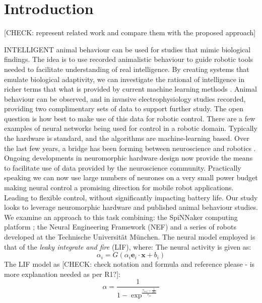 \documentclass[conference]{IEEEtran}
\begin{document}
\IEEEpeerreviewmaketitle


\section{Introduction}

[CHECK: represent related work and compare them with the proposed approach]

INTELLIGENT animal behaviour can be used for studies that mimic biological findings. The idea is to use recorded animalistic behaviour to guide robotic tools needed to facilitate understanding of real intelligence. By creating systems that emulate biological adaptivity, we can investigate the rational of intelligence in richer terms that what is provided by current machine learning methods \cite{mcfarland1993intelligent}. Animal behaviour can be observed, and in invasive electrophysiology studies recorded, providing two complimentary sets of data to support further study.  The open question is how best to make use of this data for robotic control. There are a few examples of neural networks being used for control \cite{janglova2005neural} in a robotic domain. Typically the hardware is standard, and the algorithms are machine-learning based. Over the last few years, a bridge has been forming between neuroscience and robotics \cite{webb2000does}. Ongoing developments in neuromorphic hardware design now provide the means to facilitate use of data provided by the neuroscience community. Practically speaking we can now use large numbers of neurones on a very small power budget making neural control a promising direction for mobile robot applications. Leading to flexible control, without significantly impacting battery life.  Our study looks to leverage neuromorphic hardware and published animal behaviour studies. We examine an approach to this task combining: the SpiNNaker computing platform \cite{furber2007neural, furber2014spinnaker}; the Neural Engineering Framework (NEF)  \cite{eliasmith2004neural} and a series of robots developed at the Technische Universit{\"a}t M{\"u}nchen. The neural model employed is that of the \textit{leaky integrate and fire} (LIF), where:
The neural activity is given as:
\begin{equation}
\alpha_i = G(\alpha_i \textbf{e}_i \cdot \textbf{x} + \textit{b}_i )
\end{equation}
The LIF model as \cite{gerstner2002spiking} [CHECK: check notation and formula and reference please - is more explanation needed as per R1?]:
\begin{equation}
\alpha = \frac{1}{1-\exp^\frac{\tau_{ref}-\frac{1}{\mathit{Hz}}}{\tau_{rc}}}
\end{equation}
\end{document}
